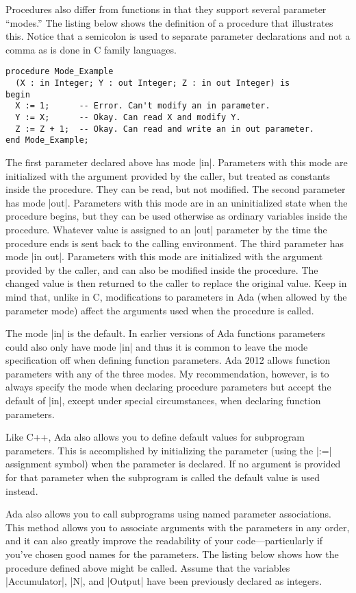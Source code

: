 Procedures also differ from functions in that they support several parameter ``modes.'' The
listing below shows the definition of a procedure that illustrates this. Notice that a
semicolon is used to separate parameter declarations and not a comma as is done in C family
languages.

\begin{lstlisting}
procedure Mode_Example
  (X : in Integer; Y : out Integer; Z : in out Integer) is
begin
  X := 1;      -- Error. Can't modify an in parameter.
  Y := X;      -- Okay. Can read X and modify Y.
  Z := Z + 1;  -- Okay. Can read and write an in out parameter.
end Mode_Example;
\end{lstlisting}

The first parameter declared above has mode |in|. Parameters with this mode are initialized with
the argument provided by the caller, but treated as constants inside the procedure. They can be
read, but not modified. The second parameter has mode |out|. Parameters with this mode are in an
uninitialized state when the procedure begins, but they can be used otherwise as ordinary
variables inside the procedure. Whatever value is assigned to an |out| parameter by the time the
procedure ends is sent back to the calling environment. The third parameter has mode |in out|.
Parameters with this mode are initialized with the argument provided by the caller, and can also
be modified inside the procedure. The changed value is then returned to the caller to replace
the original value. Keep in mind that, unlike in C, modifications to parameters in Ada (when
allowed by the parameter mode) affect the arguments used when the procedure is called.

The mode |in| is the default. In earlier versions of Ada functions parameters could also only
have mode |in| and thus it is common to leave the mode specification off when defining function
parameters. Ada 2012 allows function parameters with any of the three modes. My recommendation,
however, is to always specify the mode when declaring procedure parameters but accept the
default of |in|, except under special circumstances, when declaring function parameters.

Like C++, Ada also allows you to define default values for subprogram parameters. This is
accomplished by initializing the parameter (using the |:=| assignment symbol) when the parameter
is declared. If no argument is provided for that parameter when the subprogram is called the
default value is used instead.

Ada also allows you to call subprograms using named parameter associations. This method allows
you to associate arguments with the parameters in any order, and it can also greatly improve the
readability of your code---particularly if you've chosen good names for the parameters. The
listing below shows how the procedure defined above might be called. Assume that the variables
|Accumulator|, |N|, and |Output| have been previously declared as integers.

